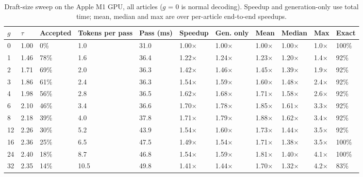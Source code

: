 \documentclass[11pt,a4paper]{article}
\begin{document}
\begin{table}[H]
\centering
\small
\caption{Draft-size sweep on the Apple M1 GPU, all articles ($g$ = 0 is normal decoding). Speedup and generation-only use total time; mean, median and max are over per-article end-to-end speedups.}
\setlength{\tabcolsep}{4pt}
\begin{tabular}{L{0.81cm}L{0.90cm}L{1.54cm}L{1.36cm}L{1.17cm}L{1.45cm}L{1.26cm}L{1.08cm}L{1.26cm}L{1.08cm}L{1.08cm}}
\toprule
\textbf{$g$} & \textbf{$\tau$} & \textbf{Accepted} & \textbf{Tokens per pass} & \textbf{Pass (ms)} & \textbf{Speedup} & \textbf{Gen. only} & \textbf{Mean} & \textbf{Median} & \textbf{Max} & \textbf{Exact} \\
 & 1.00 & 0\% & 1.0 & 31.0 & 1.00$\times$ & 1.00$\times$ & 1.00$\times$ & 1.00$\times$ & 1.0$\times$ & 100\% \\
1 & 1.46 & 78\% & 1.6 & 36.4 & 1.22$\times$ & 1.24$\times$ & 1.23$\times$ & 1.20$\times$ & 1.4$\times$ & 92\% \\
2 & 1.71 & 69\% & 2.0 & 36.3 & 1.42$\times$ & 1.46$\times$ & 1.45$\times$ & 1.39$\times$ & 1.9$\times$ & 92\% \\
3 & 1.86 & 61\% & 2.4 & 36.3 & 1.54$\times$ & 1.59$\times$ & 1.60$\times$ & 1.48$\times$ & 2.4$\times$ & 92\% \\
4 & 1.98 & 56\% & 2.8 & 36.5 & 1.62$\times$ & 1.68$\times$ & 1.71$\times$ & 1.58$\times$ & 2.6$\times$ & 92\% \\
6 & 2.10 & 46\% & 3.4 & 36.6 & 1.70$\times$ & 1.78$\times$ & 1.85$\times$ & 1.61$\times$ & 3.3$\times$ & 92\% \\
8 & 2.18 & 39\% & 4.0 & 37.8 & 1.71$\times$ & 1.79$\times$ & 1.88$\times$ & 1.62$\times$ & 3.4$\times$ & 92\% \\
12 & 2.26 & 30\% & 5.2 & 43.9 & 1.54$\times$ & 1.60$\times$ & 1.73$\times$ & 1.44$\times$ & 3.5$\times$ & 92\% \\
16 & 2.36 & 25\% & 6.5 & 47.5 & 1.49$\times$ & 1.54$\times$ & 1.71$\times$ & 1.38$\times$ & 3.5$\times$ & 100\% \\
24 & 2.40 & 18\% & 8.7 & 46.8 & 1.54$\times$ & 1.59$\times$ & 1.81$\times$ & 1.40$\times$ & 4.1$\times$ & 100\% \\
32 & 2.35 & 14\% & 10.5 & 49.8 & 1.41$\times$ & 1.44$\times$ & 1.70$\times$ & 1.32$\times$ & 4.2$\times$ & 83\% \\
\bottomrule
\end{tabular}
\end{table}
\end{document}
